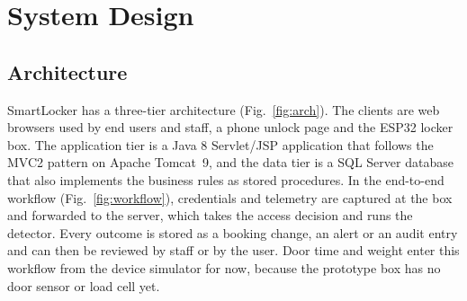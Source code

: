 \section{System Design}

\subsection{Architecture}

SmartLocker has a three-tier architecture (Fig.~\ref{fig:arch}). The clients are web browsers used by end users and
staff, a phone unlock page and the ESP32 locker box. The application tier is a Java 8 Servlet/JSP application that
follows the MVC2 pattern on Apache Tomcat~9, and the data tier is a SQL Server database that also implements the
business rules as stored procedures. In the end-to-end workflow (Fig.~\ref{fig:workflow}), credentials and telemetry
are captured at the box and forwarded to the server, which takes the access decision and runs the detector. Every
outcome is stored as a booking change, an alert or an audit entry and can then be reviewed by staff or by the user.
Door time and weight enter this workflow from the device simulator for now, because the prototype box has no door
sensor or load cell yet.


